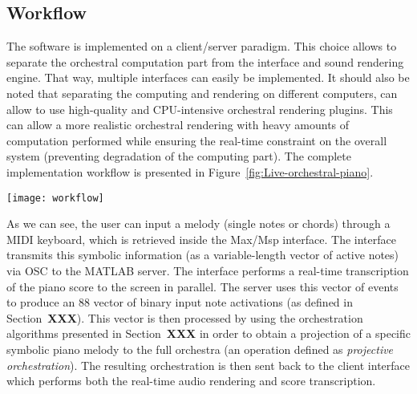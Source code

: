 \documentclass[letterpaper]{article}
\begin{document}
\subsection{Workflow}
The software is implemented on a client/server paradigm. This choice
allows to separate the orchestral computation part from the interface
and sound rendering engine. That way, multiple interfaces can easily
be implemented. It should also be noted that separating the computing
and rendering on different computers, can allow to use high-quality
and CPU-intensive orchestral rendering plugins. This can allow a more
realistic orchestral rendering with heavy amounts of computation performed
while ensuring the real-time constraint on the overall system (preventing
degradation of the computing part). The complete implementation workflow
is presented in Figure~\ref{fig:Live-orchestral-piano}.

\begin{figure*}
\begin{centering}
\texttt{[image: workflow]}
\par\end{centering}

\caption{\label{fig:Live-orchestral-piano}Live orchestral piano (L.O.P) implementation
workflow. The user inputs a melody which is transcribed into a score
and send via OSC from the Max/Msp client. Then, the MATLAB server
uses this vector of notes and process it following the aforementioned
techniques in order to obtain the orchestration. This information
is then sent back to Max/Msp which performs the real-time audio rendering }
\end{figure*}


As we can see, the user can input a melody (single notes or chords)
through a MIDI keyboard, which is retrieved inside the Max/Msp interface.
The interface transmits this symbolic information (as a variable-length
vector of active notes) via OSC to the MATLAB server. The interface
performs a real-time transcription of the piano score to the screen
in parallel. The server uses this vector of events to produce an 88
vector of binary input note activations (as defined in Section~\textbf{XXX}).
This vector is then processed by using the orchestration algorithms
presented in Section~\textbf{XXX} in order to obtain a projection
of a specific symbolic piano melody to the full orchestra (an operation
defined as \emph{projective orchestration}). The resulting orchestration
is then sent back to the client interface which performs both the
real-time audio rendering and score transcription. 
\end{document}
